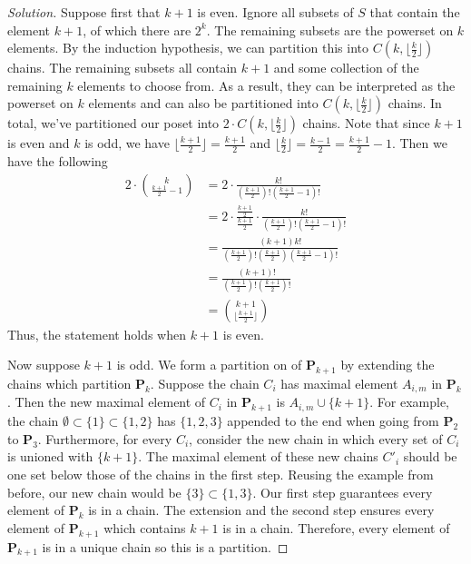 \documentclass[12pt]{article}
\theoremstyle{definition}
\newenvironment{solution}{
  \begin{proof}[Solution]
    \vspace{-8px}
    \setlength{\parskip}{4px}
    \setlength{\parindent}{0px}
}{
\end{proof}
}
\begin{document}
\begin{solution}
    Suppose first that \(k + 1\) is even. Ignore all subsets of \(S\) that contain the element \(k + 1\), of which there are \(2^{k}\). The remaining subsets are the powerset on \(k\) elements. By the induction hypothesis, we can partition this into \(C\left(k, \lfloor{\frac{k}{2}}\rfloor\right)\) chains. The remaining subsets all contain \(k+1\) and some collection of the remaining \(k\) elements to choose from. As a result, they can be interpreted as the powerset on \(k\) elements and can also be partitioned into \(C\left(k, \lfloor{\frac{k}{2}}\rfloor\right)\) chains. In total, we've partitioned our poset into \(2 \cdot C\left(k, \lfloor{\frac{k}{2}}\rfloor\right)\) chains. Note that since \(k+1\) is even and \(k\) is odd, we have \(\lfloor{\frac{k+1}{2}}\rfloor = \frac{k+1}{2}\) and \(\lfloor{\frac{k}{2}}\rfloor = \frac{k - 1}{2} = \frac{k + 1}{2} - 1\). Then we have the following
    \begin{align*}
      2 \cdot {k \choose \frac{k+1}{2} - 1} &= 2 \cdot \frac{k!}{\left(\frac{k+1}{2}\right)! \left(\frac{k+1}{2} - 1\right)!} \\
      &= 2 \cdot \frac{\frac{k+1}{2}}{\frac{k+1}{2}} \cdot \frac{k!}{\left(\frac{k+1}{2}\right)! \left(\frac{k+1}{2} - 1\right)!} \\
      &= \frac{\left(k+1\right) k!}{\left(\frac{k+1}{2}\right)! \left(\frac{k+1}{2}\right) \left(\frac{k+1}{2} - 1\right)!} \\
      &= \frac{\left(k + 1\right)!}{\left(\frac{k+1}{2}\right)! \left(\frac{k+1}{2}\right)!} \\
      &= {k+1 \choose \lfloor{\frac{k + 1}{2}}\rfloor}
    \end{align*}
    Thus, the statement holds when \(k + 1\) is even.

    Now suppose \(k + 1\) is odd. We form a partition on of \(\textbf{P}_{k+1}\) by extending the chains which partition \(\textbf{P}_{k}\). Suppose the chain \(C_{i}\) has maximal element \(A_{i, m}\) in \(\textbf{P}_{k}\). Then the new maximal element of \(C_{i}\) in \(\textbf{P}_{k+1}\) is \(A_{i, m} \cup \{k+1\}\). For example, the chain \(\emptyset \subset \{1\} \subset \{1, 2\}\) has \(\{1, 2, 3\}\) appended to the end when going from \(\textbf{P}_{2}\) to \(\textbf{P}_{3}\). Furthermore, for every \(C_{i}\), consider the new chain in which every set of \(C_{i}\) is unioned with \(\{k+1\}\). The maximal element of these new chains \(C'_{i}\) should be one set below those of the chains in the first step. Reusing the example from before, our new chain would be \(\{3\} \subset \{1, 3\}\). Our first step guarantees every element of \(\textbf{P}_{k}\) is in a chain. The extension and the second step ensures every element of \(\textbf{P}_{k+1}\) which contains \(k+1\) is in a chain. Therefore, every element of \(\textbf{P}_{k+1}\) is in a unique chain so this is a partition.


\end{solution}
\end{document}
